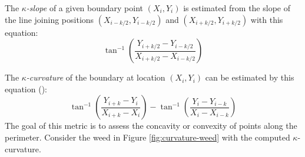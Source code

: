 \documentclass[letterpaper, notitlepage]{report}
\begin{document}
{The \textit{$\kappa$-slope} of a given boundary point $(X_i, Y_i)$ is estimated from the slope of the line joining positions $(X_{i-k/2}, Y_{i-k/2})$ and $(X_{i+k/2}, Y_{i+k/2})$ with this equation:
\begin{equation}
\tan^{-1}\left(\frac{Y_{i+k/2} - Y_{i-k/2}}{X_{i+k/2} - X_{i-k/2}}\right)
\end{equation}
 
 The \textit{$\kappa$-curvature} of the boundary at location $(X_i,Y_i)$ can be estimated by this equation (\cite{Yan2017-do}):
 \begin{equation}
 \tan^{-1}\left(\frac{Y_{i+k} - Y_{i}}{X_{i+k} - X_{i}}\right) - \tan^{-1}\left(\frac{Y_{i} - Y_{i-k}}{X_{i} - X_{i-k} }\right)
 \end{equation}
 The goal of this metric is to assess the concavity or convexity of points along the perimeter. Consider the weed in Figure \ref{fig:curvature-weed} with the computed $\kappa$-curvature.
 
}
\end{document}
